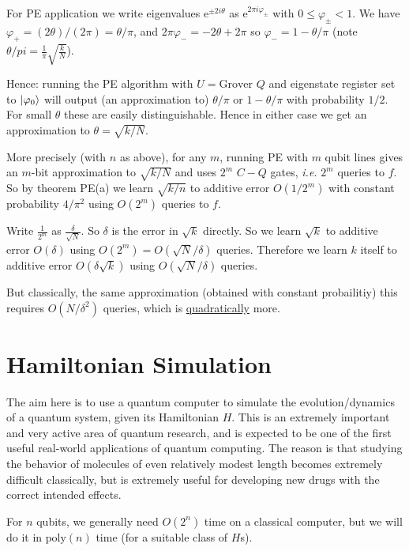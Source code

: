 \documentclass[]{article}
\DeclarePairedDelimiter\ket{\lvert}{\rangle}
\theoremstyle{custhm}
\theoremstyle{cusdef}
\theoremstyle{custhm}
\theoremstyle{custhm}
\theoremstyle{custhm}
\theoremstyle{custhm}
\theoremstyle{cusdef}
\theoremstyle{remark}
\newcommand{\e}{\mathrm{e}}
\renewcommand{\phi}{\varphi}
\newcommand{\poly}{\textrm{poly}}
\begin{document}
\begin{enumerate}
	For PE application we write eigenvalues $\e^{\pm2i\theta}$ as $\e^{2\pi i\phi_{\pm}}$ with $0\le \phi_{\pm} < 1$. We have $\phi_+ = (2\theta)/(2\pi) = \theta/\pi$, and $2\pi \phi_- = -2\theta+2\pi$ so $\phi_- = 1 - \theta/\pi$ (note $\theta/pi = \frac{1}{\pi}\sqrt{\frac{k}{N}}$).

	Hence: running the PE algorithm with $U = \textrm{Grover }Q$ and eigenstate register set to $\ket{\phi_0}$ will output (an approximation to) $\theta/\pi$ or $1 - \theta/\pi$ with probability $1/2$. For small $\theta$ these are easily distinguishable. Hence in either case we get an approximation to $\theta = \sqrt{k/N}$.

	More precisely (with $n$ as above), for any $m$, running PE with $m$ qubit lines gives an $m$-bit approximation to $\sqrt{k/N}$ and uses $2^m$ $C-Q$ gates, \textit{i.e.} $2^m$ queries to $f$. So by theorem PE(a) we learn $\sqrt{k/n}$ to additive error $O(1/2^m)$ with constant probability $4/\pi^2$ using $O(2^m)$ queries to $f$.

	Write $\frac{1}{2^m}$ as $\frac{\delta}{\sqrt{N}}$. So $\delta$ is the error in $\sqrt{k}$ directly. So we learn $\sqrt{k}$ to additive error $O(\delta)$ using $O(2^m) = O(\sqrt{N}/\delta)$ queries. Therefore we learn $k$ itself to additive error $O(\delta\sqrt{k})$ using $O(\sqrt{N}/\delta)$ queries.

	But classically, the same approximation (obtained with constant probailitiy) this requires $O(N/\delta^2)$ queries, which is \underline{quadratically} more.

\end{enumerate}

\section{Hamiltonian Simulation}

The aim here is to use a quantum computer to simulate the evolution/dynamics of a quantum system, given its Hamiltonian $H$. This is an extremely important and very active area of quantum research, and is expected to be one of the first useful real-world applications of quantum computing. The reason is that studying the behavior of molecules of even relatively modest length becomes extremely difficult classically, but is extremely useful for developing new drugs with the correct intended effects.

For $n$ qubits, we generally need $O(2^n)$ time on a classical computer, but we will do it in $\poly(n)$ time (for a suitable class of $H$s).
\end{document}
